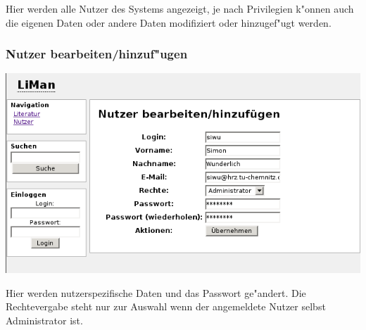 Hier werden alle Nutzer des Systems angezeigt, je nach Privilegien k"onnen auch die eigenen Daten oder andere
Daten modifiziert oder hinzugef"ugt werden.

\subsubsection{Nutzer bearbeiten/hinzuf"ugen}
\includegraphics[scale=0.6]{usermod.png}

Hier werden nutzerspezifische Daten und das Passwort ge"andert. Die Rechtevergabe steht nur zur Auswahl wenn
der angemeldete Nutzer selbst Administrator ist.
